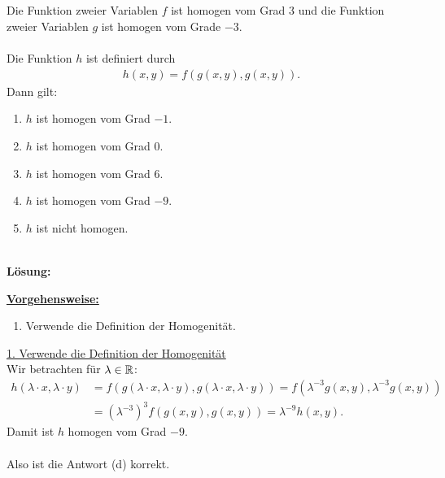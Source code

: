 \newpage

\subsection*{}
Die Funktion zweier Variablen $ f $ ist homogen vom Grad $ 3 $ und die Funktion zweier Variablen $ g $ ist homogen vom Grade $ -3 $.\\
\\
Die Funktion $ h $ ist definiert durch
\begin{align*}
	h(x,y) = f(g(x,y),g(x,y)).
\end{align*}
Dann gilt:
\renewcommand{\labelenumi}{(\alph{enumi})}
\begin{enumerate}
	\item 
	$ h $ ist homogen vom Grad $ -1 $. 
	\item
	$ h $ ist homogen vom Grad $ 0 $. 
	\item
	$ h $ ist homogen vom Grad $ 6 $. 
	\item
	$ h $ ist homogen vom Grad $ -9 $.  
	\item
	$ h $ ist nicht homogen.
\end{enumerate}
\ \\
\textbf{Lösung:}
\begin{mdframed}
	\underline{\textbf{Vorgehensweise:}}
	\renewcommand{\labelenumi}{\theenumi.}
	\begin{enumerate}
		\item Verwende die Definition der Homogenität.
	\end{enumerate}
\end{mdframed}

\underline{1. Verwende die Definition der Homogenität}\\
Wir betrachten für $ \lambda \in \mathbb{R} $:
\begin{align*}
	h(\lambda \cdot x, \lambda \cdot y)
	&=
	f(g(\lambda \cdot x,\lambda \cdot y),g(\lambda \cdot x,\lambda \cdot y))
	=
	f(\lambda^{-3}g(x,y),\lambda^{-3} g(x,y))\\
	&=
	(\lambda^{-3})^3 f(g(x,y),g(x,y))
	=
	\lambda^{-9} h(x,y).
\end{align*}
Damit ist $ h $ homogen vom Grad $ -9 $.\\
\\
Also ist die Antwort (d) korrekt.